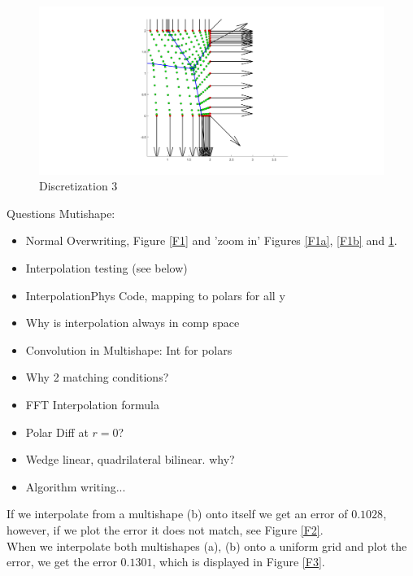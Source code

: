 \documentclass[11pt, a4paper]{article}
\theoremstyle{definition}
\begin{document}
\begin{figure}[h]
	\centering
	\includegraphics[scale=0.4]{F3.png}
	\caption{Discretization 3} 
	\label{F1c}
\end{figure}


Questions Mutishape:\\
\begin{itemize}
	\item Normal Overwriting, Figure \ref{F1} and 'zoom in' Figures \ref{F1a}, \ref{F1b} and \ref{F1c}.
	\item Interpolation testing (see below)
	\item InterpolationPhys Code, mapping to polars for all y
	\item Why is interpolation always in comp space
	\item Convolution in Multishape: Int for polars
	\item Why 2 matching conditions?
	\item FFT Interpolation formula
	\item Polar Diff at $r=0$?
	\item Wedge linear, quadrilateral bilinear. why?
	\item Algorithm writing...
\end{itemize}



If we interpolate from a multishape (b) onto itself we get an error of $0.1028$, however, if we plot the error it does not match, see Figure \ref{F2}. \\
When we interpolate both multishapes (a), (b) onto a uniform grid and plot the error, we get the error $ 0.1301$, which is displayed in Figure \ref{F3}.
\end{document}
